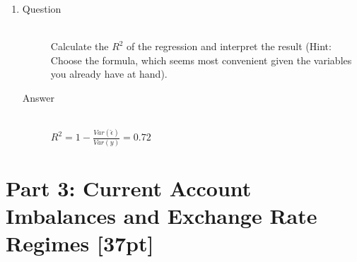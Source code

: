 \documentclass{article}
\begin{document}
\begin{enumerate}
  \item
  \begin{description}
    \item[Question] \hfill \\
    Calculate the $R^2$ of the regression and interpret the result (Hint: Choose the formula, which seems most convenient given the variables you already have at hand).
    \item[Answer] \hfill \\
    $R^2 = 1 - \frac{Var(\hat{\epsilon})}{Var(y)} = 0.72$
  \end{description}
  
\end{enumerate}

\section{Part 3: Current Account Imbalances and Exchange Rate Regimes [37pt]}
\end{document}
